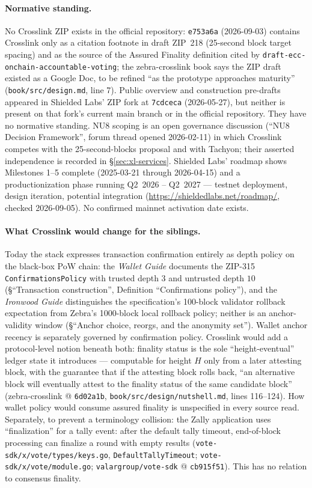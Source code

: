 \documentclass[11pt,a4paper]{article}
\theoremstyle{definition}
\begin{document}
\paragraph{Normative standing.} No Crosslink ZIP exists in the official
repository: \texttt{e753a6a} (2026-09-03) contains Crosslink only as a
citation footnote in draft ZIP~218 (25-second block target spacing) and as
the source of the Assured Finality definition cited by
\texttt{draft-ecc-}\allowbreak\texttt{onchain-accountable-voting}; the
zebra-crosslink book says the ZIP draft existed as a Google Doc, to be
refined ``as the prototype approaches maturity''
(\texttt{book/src/design.md}, line 7). Public overview and construction
pre-drafts appeared in Shielded Labs' ZIP fork at \texttt{7cdceca}
(2026-05-27), but neither is present on that fork's current main branch or
in the official repository. They have no normative standing.
NU8 scoping is an open governance discussion (``NU8 Decision Framework'',
forum thread opened 2026-02-11) in which Crosslink competes with the
25-second-blocks proposal and with Tachyon; their asserted independence is
recorded in \S\ref{sec:xl-services}. Shielded Labs' roadmap shows
Milestones 1--5 complete (2025-03-21 through 2026-04-15) and a
productionization phase running Q2~2026 -- Q2~2027 --- testnet
deployment, design iteration, potential integration
(\url{https://shieldedlabs.net/roadmap/}, checked 2026-09-05). No confirmed mainnet
activation date exists.

\paragraph{What Crosslink would change for the siblings.} Today the stack
expresses transaction confirmation entirely as depth policy on the
black-box PoW chain: the \emph{Wallet Guide} documents the ZIP-315
\texttt{ConfirmationsPolicy} with trusted depth $3$ and untrusted depth
$10$ (\S``Transaction construction'', Definition ``Confirmations
policy''), and the \emph{Ironwood Guide} distinguishes the specification's
100-block validator rollback expectation from Zebra's 1000-block local
rollback policy; neither is an anchor-validity window
(\S``Anchor choice, reorgs, and the anonymity set''). Wallet anchor recency
is separately governed by confirmation policy. Crosslink would add a
protocol-level notion beneath both: finality status is the sole
``height-eventual'' ledger state it introduces --- computable for height
$H$ only from a later attesting block, with the guarantee that if the
attesting block rolls back, ``an alternative block will eventually attest
to the finality status of the same candidate block'' (zebra-crosslink @
\texttt{6d02a1b}, \texttt{book/src/design/nutshell.md}, lines 116--124).
How wallet policy would consume assured finality is unspecified in every
source read. Separately, to prevent a terminology collision: the
Zally application uses ``finalization'' for a tally event: after the default
tally timeout, end-of-block processing can finalize a round with empty
results (\texttt{vote-sdk/x/vote/types/keys.go},
\texttt{DefaultTallyTimeout}; \texttt{vote-sdk/x/vote/module.go};
\texttt{valargroup/vote-sdk} @ \texttt{cb915f51}). This has no relation to
consensus finality.
\end{document}
